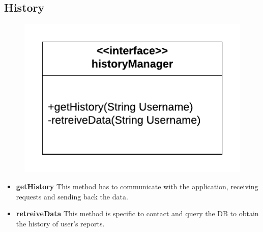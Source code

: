 \documentclass[12pt,a4paper]{report}
\begin{document}
			\subsection{History}
				\begin{figure}[H]
						\includegraphics[center]{historyInterface}
						\label{fig: interfaces}
				\end{figure}
				\begin{itemize}
					\item \textbf{getHistory} This method has to communicate with the application, receiving requests and
						sending back the data.
					\item \textbf{retreiveData} This method is specific to contact and query the DB to obtain the history of
						user's reports. 
				\end{itemize}
\end{document}
